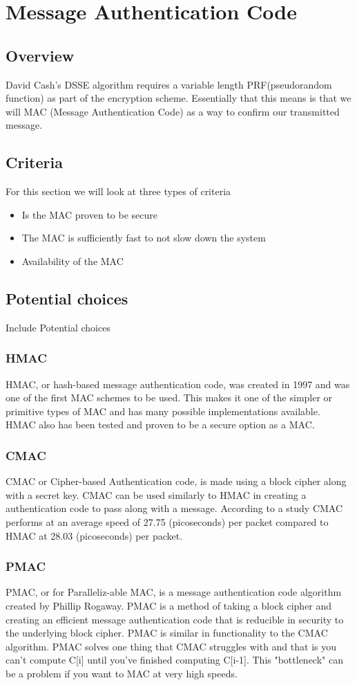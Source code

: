 \section{ Message Authentication Code }
\subsection{ Overview }
David Cash's DSSE algorithm requires a variable length PRF(pseudorandom function) as part of the encryption scheme. Essentially that this means is that we will MAC (Message Authentication Code) as a way to confirm our transmitted message. 
\subsection{ Criteria }
For this section we will look at three types of criteria\
\begin{itemize}
\item Is the MAC proven to be secure
\item The MAC is sufficiently fast to not slow down the system
\item Availability of the MAC
\end{itemize}
\subsection{ Potential choices }
Include Potential choices
\subsubsection{ HMAC } 
HMAC, or hash-based message authentication code, was created in 1997 and was one of the first MAC schemes to be used. This makes it one of the simpler or primitive types of MAC and has many possible implementations available. HMAC  also has been tested and proven to be a secure option as a MAC. 
\subsubsection{ CMAC }
CMAC or Cipher-based Authentication code, is made using a block cipher along with a secret key. CMAC can be used similarly to HMAC in creating a authentication code to pass along with a message. According to a study \cite{smtech:IPSEC}
CMAC performs at an average speed of 27.75 (picoseconds) per packet compared to HMAC at 28.03 (picoseconds) per packet. 

\subsubsection{ PMAC }
PMAC, or for Paralleliz-able MAC, is a message authentication code algorithm created by Phillip Rogaway. PMAC is a method of taking a block cipher and creating an efficient message authentication code that is reducible in security to the underlying block cipher. PMAC is similar in functionality to the CMAC algorithm. PMAC solves one thing that CMAC struggles with and that is you can't compute C[i] until you've finished computing C[i-1]. This "bottleneck" can be a problem if you want to MAC at very high speeds. \cite{smtech:PMAC}
    
